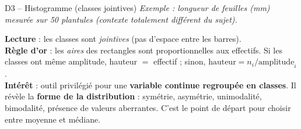 \documentclass[11pt,a4paper]{article}
\begin{document}
\begin{vignetteCours}{D3 -- Histogramme (classes jointives)}
\emph{Exemple : longueur de feuilles (mm) mesurée sur 50 plantules (contexte totalement différent du sujet).}
\begin{center}
\end{center}
\textbf{Lecture} : les classes sont \emph{jointives} (pas d'espace entre les barres).\\
\textbf{Règle d'or} : les \emph{aires} des rectangles sont proportionnelles aux effectifs. Si les classes ont même amplitude, hauteur $=$ effectif ; sinon, $\text{hauteur} = n_i / \text{amplitude}_i$.\\
\textbf{Intérêt} : outil privilégié pour une \textbf{variable continue regroupée en classes}. Il révèle la \textbf{forme de la distribution} : symétrie, asymétrie, unimodalité, bimodalité, présence de valeurs aberrantes. C'est le point de départ pour choisir entre moyenne et médiane.
\end{vignetteCours}
\end{document}
